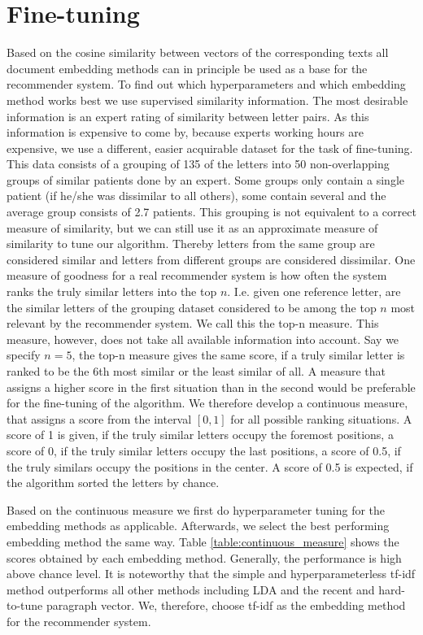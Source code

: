 \section{Fine-tuning}
Based on the cosine similarity between vectors of the corresponding texts all document embedding methods can in principle be used as a base for the recommender system. To find out which hyperparameters and which embedding method works best we use supervised similarity information. The most desirable information is an expert rating of similarity between letter pairs. As this information is expensive to come by, because experts working hours are expensive, we use a different, easier acquirable dataset for the task of fine-tuning. This data consists of a grouping of 135 of the letters into 50 non-overlapping groups of similar patients done by an expert. Some groups only contain a single patient (if he/she was dissimilar to all others), some contain several and the average group consists of 2.7 patients. This grouping is not equivalent to a correct measure of similarity, but we can still use it as an approximate measure of similarity to tune our algorithm. Thereby letters from the same group are considered similar and letters from different groups are considered dissimilar. One measure of goodness for a real recommender system is how often the system ranks the truly similar letters into the top $n$. I.e. given one reference letter, are the similar letters of the grouping dataset considered to be among the top $n$ most relevant by the recommender system.  We call this the top-n measure. This measure, however, does not take all available information into account. Say we specify $n=5$, the top-n measure gives the same score, if a truly similar letter is ranked to be the 6th most similar or the least similar of all. A measure that assigns a higher score in the first situation than in the second would be preferable for the fine-tuning of the algorithm. We therefore develop a continuous measure, that assigns a score from the interval $[0,1]$ for all possible ranking situations. A score of 1 is given, if the truly similar letters occupy the foremost positions, a score of 0, if the truly similar letters occupy the last positions, a score of 0.5, if the truly similars occupy the positions in the center. A score of 0.5 is expected, if the algorithm sorted the letters by chance.

Based on the continuous measure we first do hyperparameter tuning for the embedding methods as applicable. Afterwards, we select the best performing embedding method the same way. Table \ref{table:continuous_measure} shows the scores obtained by each embedding method. Generally, the performance is high above chance level. It is noteworthy that the simple and hyperparameterless tf-idf method outperforms all other methods including LDA and the recent and hard-to-tune paragraph vector. We, therefore, choose tf-idf as the embedding method for the recommender system. 

